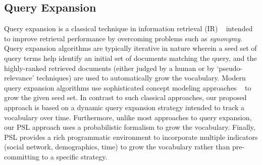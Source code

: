 \subsection{Query Expansion}
Query expansion is a classical technique in information retrieval (IR) ~\cite{manning2008introduction} intended to improve
retrieval performance by overcoming problems such as {\it synonymy}. Query expansion algorithms
are typically iterative in nature wherein a seed set of query terms help identify an initial set
of documents matching the query, and the highly-ranked retrieved documents (either judged by a human
or by `pseudo-relevance' techniques) are used to automatically grow the vocabulary. Modern
query expansion algorithms use sophisticated concept modeling approaches ~\cite{metzler2007latent}
to grow the given seed set. In contrast to such classical approaches,
our proposed approach is based on a dynamic query expansion strategy  intended to track a vocabulary
over time. Furthermore, unlike most approaches to query expansion, our PSL approach uses a probabilistic formalism
to grow the vocabulary. Finally, PSL provides a rich programmatic environment to incorporate 
multiple indicators (social network, demographics, time) to grow the vocabulary rather than pre-committing to a 
specific strategy.

